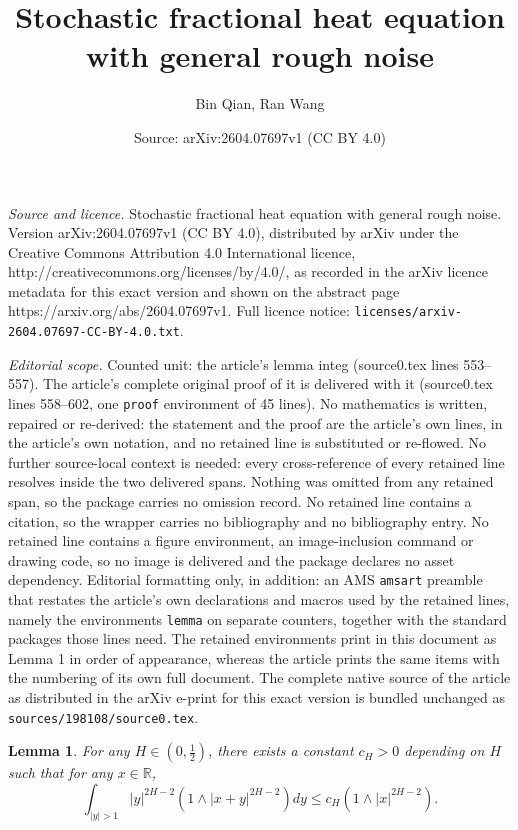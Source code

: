 \documentclass[10pt,a4paper]{amsart}
\title{Stochastic fractional heat equation with general rough noise}
\author{Bin Qian, Ran Wang}
\date{Source: arXiv:2604.07697v1 (CC BY 4.0)}
\newtheorem{lemma}{Lemma}
\begin{document}
\maketitle

\noindent\emph{Source and licence.} Stochastic fractional heat equation with general rough noise. Version arXiv:2604.07697v1 (CC BY 4.0), distributed by arXiv under the Creative Commons Attribution 4.0 International licence, http://creativecommons.org/licenses/by/4.0/, as recorded in the arXiv licence metadata for this exact version and shown on the abstract page https://arxiv.org/abs/2604.07697v1. Full licence notice: \texttt{licenses/arxiv-2604.07697-CC-BY-4.0.txt}.\par\smallskip

\noindent\textit{Editorial scope.} Counted unit: the article's lemma integ (source0.tex lines 553--557). The article's complete original proof of it is delivered with it (source0.tex lines 558--602, one \texttt{proof} environment of 45 lines). No mathematics is written, repaired or re-derived: the statement and the proof are the article's own lines, in the article's own notation, and no retained line is substituted or re-flowed.  No further source-local context is needed: every cross-reference of every retained line resolves inside the two delivered spans.  Nothing was omitted from any retained span, so the package carries no omission record.  No retained line contains a citation, so the wrapper carries no bibliography and no bibliography entry.  No retained line contains a figure environment, an image-inclusion command or drawing code, so no image is delivered and the package declares no asset dependency.  Editorial formatting only, in addition: an AMS \texttt{amsart} preamble that restates the article's own declarations and macros used by the retained lines, namely the environments \texttt{lemma} on separate counters, together with the standard packages those lines need.  The retained environments print in this document as Lemma 1 in order of appearance, whereas the article prints the same items with the numbering of its own full document.  The complete native source of the article as distributed in the arXiv e-print for this exact version is bundled unchanged as \texttt{sources/198108/source0.tex}.
\begin{lemma}\label{lem integ} For any $H\in (0,\frac12)$, there exists a constant  $c_H>0$ depending on $H$ such that for any $x\in\mathbb{R}$,
 \begin{equation}\label{eq integ aim0}
 \int_{|y|>1}|y|^{2H-2} \left(1\wedge |x+y|^{2H-2}\right)dy\le c_H\left(1\wedge |x|^{2H-2}\right).
\end{equation}
\end{lemma}
\end{document}
